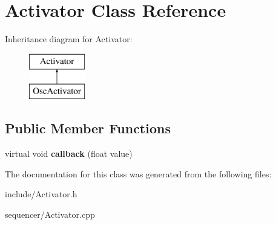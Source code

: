 \hypertarget{classActivator}{\section{Activator Class Reference}
\label{classActivator}
}
Inheritance diagram for Activator\-:\begin{figure}[H]
\begin{center}
\leavevmode
\includegraphics[height=2.000000cm]{classActivator}
\end{center}
\end{figure}
\subsection*{Public Member Functions}
\begin{DoxyCompactItemize}
\item 
\hypertarget{classActivator_ace74b175ffcc2ad9cc03f15a0e713743}{virtual void {\bfseries callback} (float value)}\label{classActivator_ace74b175ffcc2ad9cc03f15a0e713743}

\end{DoxyCompactItemize}


The documentation for this class was generated from the following files\-:\begin{DoxyCompactItemize}
\item 
include/Activator.\-h\item 
sequencer/Activator.\-cpp\end{DoxyCompactItemize}
